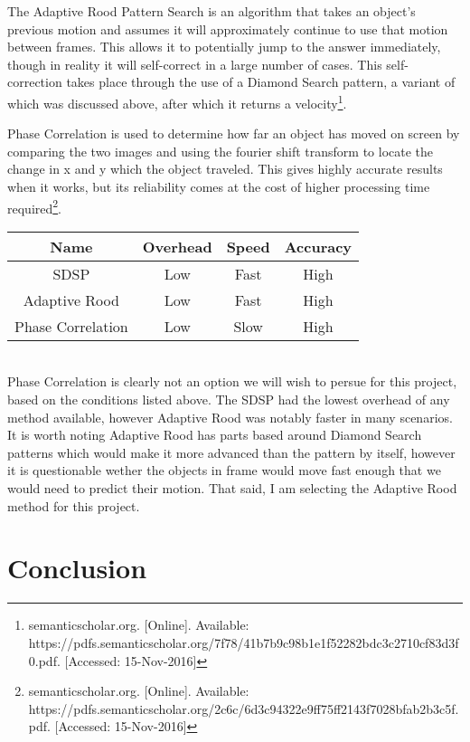 \documentclass[letterpaper,10pt,onecolumn,draftclsnofoot]{IEEEtran}
\begin{document}
The Adaptive Rood Pattern Search is an algorithm that takes an object's previous motion and assumes it will approximately continue to use that motion between frames.  This allows it to potentially jump to the answer immediately, though in reality it will self-correct in a large number of cases.  This self-correction takes place through the use of a Diamond Search pattern, a variant of which was discussed above, after which it returns a velocity\footnote{semanticscholar.org. [Online]. Available: https://pdfs.semanticscholar.org/7f78/41b7b9c98b1e1f52282bdc3c2710cf83d3f0.pdf. [Accessed: 15-Nov-2016] }.

Phase Correlation is used to determine how far an object has moved on screen by comparing the two images and using the fourier shift transform to locate the change in x and y which the object traveled.  This gives highly accurate results when it works, but its reliability  comes at the cost of higher processing time required\footnote{semanticscholar.org. [Online]. Available: https://pdfs.semanticscholar.org/2c6c/6d3c94322e9ff75ff2143f7028bfab2b3c5f.pdf. [Accessed: 15-Nov-2016] }. \\

\begin{tabular}{|c|c|c|c|}
  \hline
  \textbf{Name} & \textbf{Overhead} & \textbf{Speed} & \textbf{Accuracy} \\
  \hline
  SDSP & Low & Fast & High \\ 
  \hline
  Adaptive Rood & Low & Fast & High  \\ 
  \hline
  Phase Correlation & Low & Slow & High \\ 
  \hline
\end{tabular} \\

Phase Correlation is clearly not an option we will wish to persue for this project, based on the conditions listed above.  The SDSP had the lowest overhead of any method available, however Adaptive Rood was notably faster in many scenarios.  It is worth noting Adaptive Rood has parts based around Diamond Search patterns which would make it more advanced than the pattern by itself, however it is questionable wether the objects in frame would move fast enough that we would need to predict their motion.  That said, I am selecting the Adaptive Rood method for this project.

\newpage
\section{Conclusion}
\end{document}
